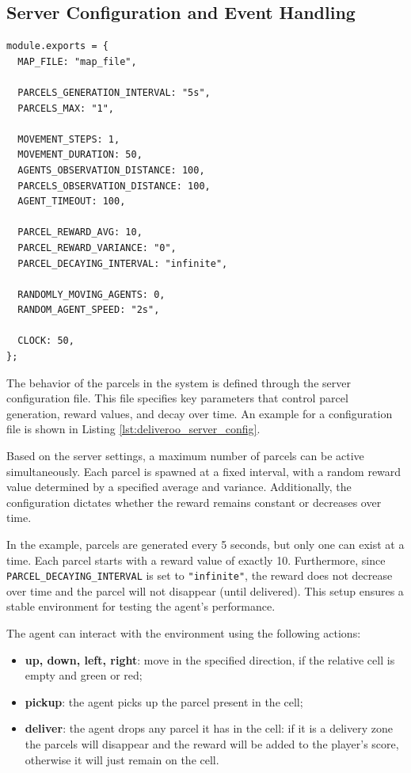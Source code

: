 \subsection{Server Configuration and Event Handling}
\label{sub:server_configuration_event_handling}
\vspace{10mm}
\begin{codewindow}
    \begin{lstlisting}
module.exports = {
  MAP_FILE: "map_file",

  PARCELS_GENERATION_INTERVAL: "5s",
  PARCELS_MAX: "1",

  MOVEMENT_STEPS: 1,
  MOVEMENT_DURATION: 50,
  AGENTS_OBSERVATION_DISTANCE: 100,
  PARCELS_OBSERVATION_DISTANCE: 100,
  AGENT_TIMEOUT: 100,

  PARCEL_REWARD_AVG: 10,
  PARCEL_REWARD_VARIANCE: "0",
  PARCEL_DECAYING_INTERVAL: "infinite",

  RANDOMLY_MOVING_AGENTS: 0,
  RANDOM_AGENT_SPEED: "2s",

  CLOCK: 50,
};
\end{lstlisting}
\end{codewindow}
\vspace{10mm}
The behavior of the parcels in the system is defined through the server configuration
file. This file specifies key parameters that control parcel generation, reward values,
and decay over time. An example for a configuration file is shown in Listing \ref{lst:deliveroo_server_config}.

Based on the server settings, a maximum number of parcels can be active
simultaneously. Each parcel is spawned at a fixed interval, with a random reward
value determined by a specified average and variance. Additionally, the
configuration dictates whether the reward remains constant or decreases over
time.

In the example, parcels are generated every 5 seconds, but only one can exist at
a time. Each parcel starts with a reward value of exactly 10. Furthermore, since
\texttt{PARCEL\_DECAYING\_INTERVAL} is set to \texttt{"infinite"}, the reward does
not decrease over time and the parcel will not disappear (until delivered). This
setup ensures a stable environment for testing the agent's performance.

The agent can interact with the environment using the following actions:
\begin{itemize}
  \item \textbf{up, down, left, right}: move in the specified direction, if the
    relative cell is empty and green or red;

  \item \textbf{pickup}: the agent picks up the parcel present in the cell;

  \item \textbf{deliver}: the agent drops any parcel it has in the cell: if it
    is a delivery zone the parcels will disappear and the reward will be added
    to the player's score, otherwise it will just remain on the cell.
\end{itemize}

